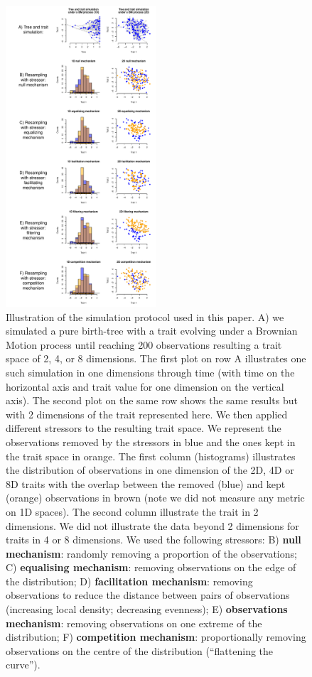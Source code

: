 \documentclass[12pt,letterpaper]{article}
\begin{document}
\begin{figure}[!htbp]
\centering
   \includegraphics[width=0.5\textwidth]{Figures/simulation_protocol.pdf}
\caption{\scriptsize{Illustration of the simulation protocol used in this paper.
A) we simulated a pure birth-tree with a trait evolving under a Brownian Motion process until reaching 200 observations resulting a trait space of 2, 4, or 8 dimensions.
The first plot on row A illustrates one such simulation in one dimensions through time (with time on the horizontal axis and trait value for one dimension on the vertical axis).
The second plot on the same row shows the same results but with 2 dimensions of the trait represented here.
We then applied different stressors to the resulting trait space.
We represent the observations removed by the stressors in blue and the ones kept in the trait space in orange.
The first column (histograms) illustrates the distribution of observations in one dimension of the 2D, 4D or 8D traits with the overlap between the removed (blue) and kept (orange) observations in brown (note we did not measure any metric on 1D spaces).
The second column illustrate the trait in 2 dimensions.
We did not illustrate the data beyond 2 dimensions for traits in 4 or 8 dimensions.
We used the following stressors:
B) \textbf{null mechanism}: randomly removing a proportion of the observations;
C) \textbf{equalising mechanism}: removing observations on the edge of the distribution;
D) \textbf{facilitation mechanism}: removing observations to reduce the distance between pairs of observations (increasing local density; decreasing evenness);
E) \textbf{observations mechanism}: removing observations on one extreme of the distribution;
F) \textbf{competition mechanism}: proportionally removing observations on the centre of the distribution (``flattening the curve'').}}
\label{Fig:simulations}
\end{figure}
\bigskip
\end{document}
